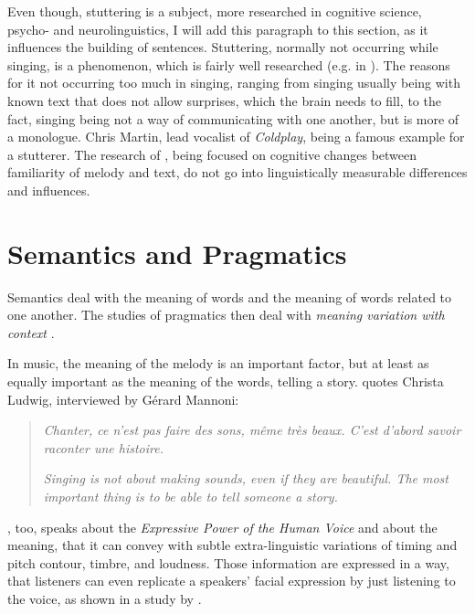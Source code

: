Even though, stuttering is a subject, more researched in cognitive science, psycho- and neurolinguistics, I will add this paragraph to this section, as it influences the building of sentences. Stuttering, normally not occurring while singing, is a phenomenon, which is fairly well researched (e.g. in \cite{healey1976factors}). The reasons for it not occurring too much in singing, ranging from singing usually being with known text that does not allow surprises, which the brain needs to fill, to the fact, singing being not a way of communicating with one another, but is more of a monologue. Chris Martin, lead vocalist of \textit{Coldplay}, being a famous example for a stutterer. The research of \cite{healey1976factors}, being focused on cognitive changes between familiarity of melody and text, do not go into linguistically measurable differences and influences.








\section{Semantics and Pragmatics}
\label{Semantics and Pragmatics}

Semantics deal with the meaning of words and the meaning of words related to one another. The studies of pragmatics then deal with \textit{meaning variation with context} \cite{bagha2011short}.

In music, the meaning of the melody is an important factor, but at least as equally important as the meaning of the words, telling a story. \cite{zedda1998linguistic} quotes Christa Ludwig, interviewed by Gérard Mannoni: 

\blockquote{\textit{Chanter, ce n’est pas faire des sons, même très beaux. C’est d’abord savoir raconter une histoire.}

\textit{Singing is not about making sounds, even if they are beautiful. The most important thing is to be able to tell someone a story.}}

\cite{rossing2007springer}, too, speaks about the \textit{Expressive Power of the Human Voice} and about the meaning, that it can convey with subtle extra-linguistic variations of timing and pitch contour, timbre, and loudness. Those information are expressed in a way, that listeners can even replicate a speakers' facial expression by just listening to the voice, as shown in a study by \cite{fonagy1967horbare}.






